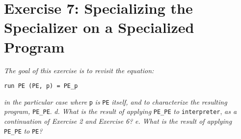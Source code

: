 \documentclass{article}
\begin{document}
\newpage

\section{Exercise 7: Specializing the Specializer on a Specialized Program}

\textit{The goal of this exercise is to revisit the equation:}
\begin{lstlisting}
run PE (PE, p) = PE_p
\end{lstlisting}
\textit{in the particular case where} \verb+p+ \textit{is} \verb+PE+ \textit{itself, and to characterize the resulting program,} \verb+PE_PE+.\linebreak \linebreak
\textit{d. What is the result of applying} \verb+PE_PE+ \textit{to} \verb+interpreter+, \textit{as a continuation of Exercise 2 and Exercise 6?}\linebreak
\textit{e. What is the result of applying} \verb+PE_PE+ \textit{to} \verb+PE+\textit{?}\linebreak \linebreak
\end{document}
